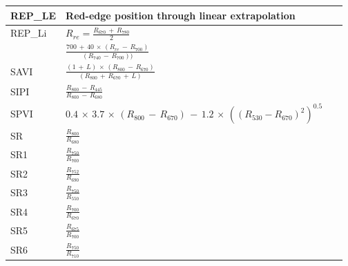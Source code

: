 \documentclass[remotesensing,article,accept,moreauthors,pdftex]{Definitions/mdpi}
\begin{document}
\begin{paracol}{2}
\begin{specialtable}[H]
{\begin{tabular}{lll}
		\midrule
		REP\_LE         & \parbox{3.8cm}{Red-edge position through linear extrapolation}                                       &~\cite{cho2006}                \\
		\midrule
		REP\_Li         & $R_{re}=\frac{R_{670}\,+\,R_{780}}{2}$                                                                  &~\cite{guyot1988}              \\
		& $\frac{700 \,+\, 40 \,\times\, (R_{re} \,-\,R_{700})}{(R_{740}\,-\,R_{700}))}$                                      &                               \\
		\midrule
		SAVI            & $\frac{(1\,+\,L)\,\times\, (R_{800}\,-\,R_{670})}{(R_{800}\,+\,R_{670}\,+\,L)}$                                          &~\cite{huete1988}              \\
		SIPI            & $\frac{R_{800}\,-\,R_{445}}{R_{800}\,-\,R_{680}}$                                                            &~\cite{penuelasj.1995}         \\
		\midrule
		SPVI            & \parbox{3.8cm}{$0.4 \,\times\, 3.7 \,\times\, (R_{800}\,-\,R_{670})\,-\,1.2 \,\times\, ((R_{530}-R_{670})^2)^{0.5}$}     &~\cite{vincini2006}            \\
		\midrule
		SR              & $\frac{R_{800}}{R_{680}}$                                                                            &~\cite{jordan1969}             \\
		SR1             & $\frac{R_{750}}{R_{700}}$                                                                            &~\cite{gitelson1997}           \\
		SR2             & $\frac{R_{752}}{R_{690}}$                                                                            &~\cite{gitelson1997}           \\
		SR3             & $\frac{R_{750}}{R_{550}}$                                                                            &~\cite{gitelson1997}           \\
		SR4             & $\frac{R_{700}}{R_{670}}$                                                                            &~\cite{mcmurtrey1994}          \\
		SR5             & $\frac{R_{675}}{R_{700}}$                                                                            &~\cite{chappelle1992}          \\
		SR6             & $\frac{R_{750}}{R_{710}}$                                                                            &~\cite{zarco-tejada1999}       \\

\end{tabular}}
\end{specialtable}
\end{paracol}
\end{document}
